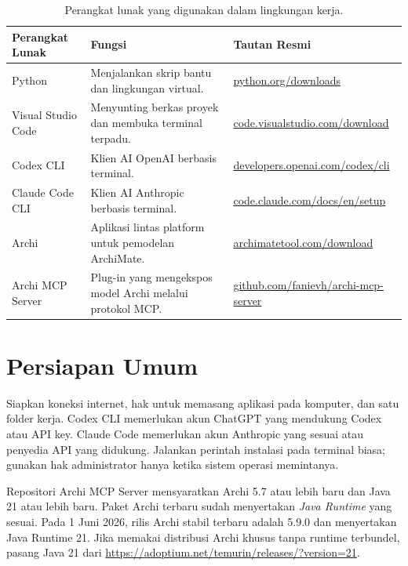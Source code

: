 \begin{table}[htbp]
\centering
\scriptsize
\caption{Perangkat lunak yang digunakan dalam lingkungan kerja.}
\label{tab:software-setup}
\begin{tabularx}{\textwidth}{@{}p{} p{} X@{}}
\hline
\textbf{Perangkat Lunak} & \textbf{Fungsi} & \textbf{Tautan Resmi} \\
\hline
Python & Menjalankan skrip bantu dan lingkungan virtual. &
\href{https://www.python.org/downloads/}{python.org/downloads} \\
Visual Studio Code & Menyunting berkas proyek dan membuka terminal terpadu. &
\href{https://code.visualstudio.com/download}{code.visualstudio.com/download} \\
Codex CLI & Klien AI OpenAI berbasis terminal. &
\href{https://developers.openai.com/codex/cli}{developers.openai.com/codex/cli} \\
Claude Code CLI & Klien AI Anthropic berbasis terminal. &
\href{https://code.claude.com/docs/en/setup}{code.claude.com/docs/en/setup} \\
Archi & Aplikasi lintas platform untuk pemodelan ArchiMate. &
\href{https://www.archimatetool.com/download/}{archimatetool.com/download} \\
Archi MCP Server & Plug-in yang mengekspos model Archi melalui protokol MCP. &
\href{https://github.com/fanievh/archi-mcp-server}{github.com/fanievh/archi-mcp-server} \\
\hline
\end{tabularx}
\end{table}

\section{Persiapan Umum}

Siapkan koneksi internet, hak untuk memasang aplikasi pada komputer, dan satu
folder kerja. Codex CLI memerlukan akun ChatGPT yang mendukung Codex atau API
key. Claude Code memerlukan akun Anthropic yang sesuai atau penyedia API yang
didukung. Jalankan perintah instalasi pada terminal biasa; gunakan hak
administrator hanya ketika sistem operasi memintanya.

Repositori Archi MCP Server mensyaratkan Archi 5.7 atau lebih baru dan Java 21
atau lebih baru. Paket Archi terbaru sudah menyertakan \emph{Java Runtime}
yang sesuai. Pada 1 Juni 2026, rilis Archi stabil terbaru adalah 5.9.0 dan
menyertakan Java Runtime 21. Jika memakai distribusi Archi khusus tanpa runtime
terbundel, pasang Java 21 dari
\url{https://adoptium.net/temurin/releases/?version=21}.

